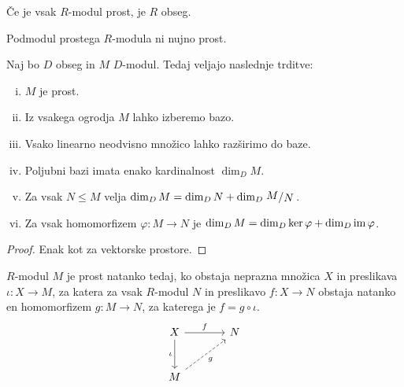 \begin{opomba}
Če je vsak $R$-modul prost, je $R$ obseg.
\end{opomba}

\begin{opomba}
Podmodul prostega $R$-modula ni nujno prost.
\end{opomba}

\begin{trditev}
Naj bo $D$ obseg in $M$ $D$-modul. Tedaj veljajo naslednje trditve:

\begin{enumerate}[i)]
\item $M$ je prost.
\item Iz vsakega ogrodja $M$ lahko izberemo bazo.
\item Vsako linearno neodvisno množico lahko razširimo do baze.
\item Poljubni bazi imata enako kardinalnost $\dim_D M$.
\item Za vsak $N \leq M$ velja
$\dim_D M = \dim_D N + \dim_D \kvoc{M}{N}$.
\item Za vsak homomorfizem $\varphi \colon M \to N$ je
$\dim_D M = \dim_D \ker \varphi + \dim_D \operatorname{im} \varphi$.
\end{enumerate}
\end{trditev}

\begin{proof}
Enak kot za vektorske prostore.
\end{proof}

\begin{trditev}
$R$-modul $M$ je prost natanko tedaj, ko obstaja neprazna množica
$X$ in preslikava $\iota \colon X \to M$, za katera za vsak
$R$-modul $N$ in preslikavo $f \colon X \to N$ obstaja natanko en
homomorfizem $g \colon M \to N$, za katerega je
$f = g \circ \iota$.
\[
\begin{tikzcd}[column sep=large, row sep=large]
X \arrow[r, "f"] \arrow[d, "\iota"'] & N
\\
M \arrow[ur, dashrightarrow, "g"']
\end{tikzcd}
\]
\end{trditev}

